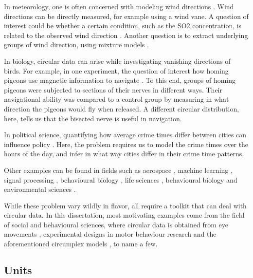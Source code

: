 \documentclass[12pt, a4paper]{book}\usepackage[]{graphicx}\usepackage{xcolor}
\begin{document}
In meteorology, one is often concerned with modeling wind directions \citep{bowers2000directional}. Wind directions can be directly measured, for example using a wind vane. A question of interest could be whether a certain condition, such as the SO2 concentration, is related to the observed wind direction \citep{garcia2013exploring}. Another question is to extract underlying groups of wind direction, using mixture models \citep{masseran2013fitting}.

In biology, circular data can arise while investigating vanishing directions of birds. For example, in one experiment, the question of interest how homing pigeons use magnetic information to navigate \citep{gagliardo2008navigational}. To this end, groups of homing pigeons were subjected to sections of their nerves in different ways. Their navigational ability was compared to a control group by measuring in what direction the pigeons would fly when released. A different circular distribution, here, tells us that the bisected nerve is useful in navigation.

In political science, quantifying how average crime times differ between cities can influence policy \citep{gill2010}. Here, the problem requires us to model the crime times over the hours of the day, and infer in what way cities differ in their crime time patterns.

Other examples can be found in fields such as aerospace \citep{kurz2017deterministic},  machine learning \citep{gopal2014mises}, signal processing \citep{traa2013wrapped}, behavioural biology \citep{nunez2018bayesian}, life sciences \citep{mardianew}, behavioural biology \citep{bulbert2015danger} and environmental sciences \citep{lagona2016regression, lagona2015hidden, arnold2006recent}.

 While these problem vary wildly in flavor, all require a toolkit that can deal with circular data. In this dissertation, most motivating examples come from the field of social and behavioural sciences, where circular data is obtained from eye movements \citep{tatler2009prominence}, experimental designs in  motor behaviour research \citep{mechsner2001perceptual, kaas2006haptic, mechsner2007bimanual, postma2008keep} and the aforementioned circumplex models \citep{Leary1957, gurtman2003circumplex,  gurtman2009exploring}, to name a few.


\subsection*{Units}
\end{document}
